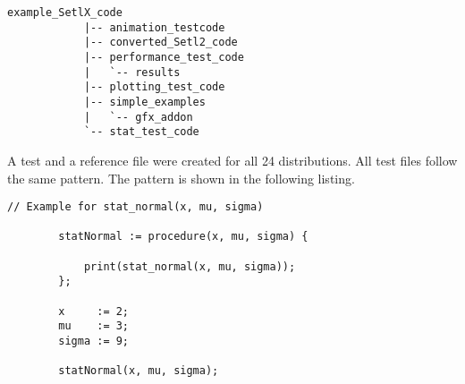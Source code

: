 	\begin{center}
		\begin{lstlisting}[caption=Folder Structure example\_SetlX\_code, label=lis:structureExample]
			example_SetlX_code
			|-- animation_testcode
			|-- converted_Setl2_code
			|-- performance_test_code
			|   `-- results
			|-- plotting_test_code
			|-- simple_examples
			|   `-- gfx_addon
			`-- stat_test_code
		\end{lstlisting}
	\end{center}

	A test and a reference file were created for all 24 distributions. All test files follow the same pattern. The pattern is shown in the following listing.

	\begin{center}
		\begin{lstlisting}[caption=Test File Example, language=setlx, label=lis:exampleCode]
		// Example for stat_normal(x, mu, sigma)

		statNormal := procedure(x, mu, sigma) {

			print(stat_normal(x, mu, sigma));
		};

		x     := 2;
		mu	  := 3;
		sigma := 9;

		statNormal(x, mu, sigma);
		\end{lstlisting}
	\end{center}